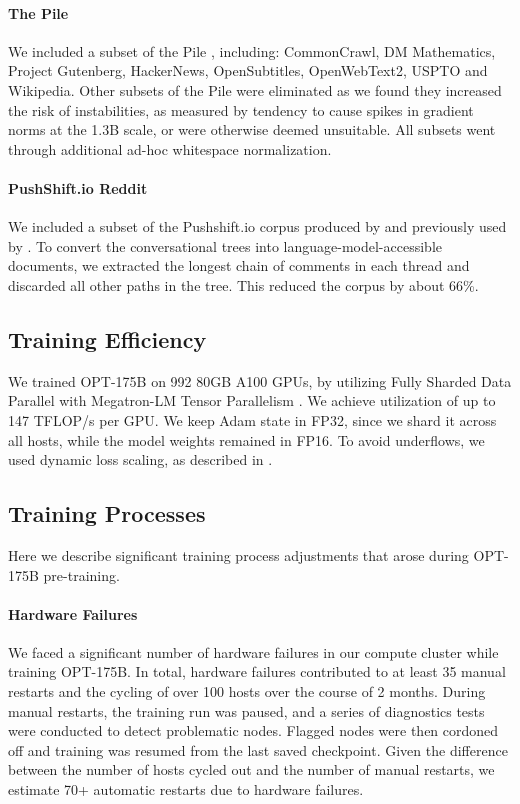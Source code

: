 \documentclass[11pt]{article}
\newcommand{\OPT}[0]{{OPT-175B}}
\begin{document}
\paragraph{The Pile} We included a subset of the Pile \cite{thepile}, including: CommonCrawl, DM Mathematics,  Project Gutenberg, HackerNews, OpenSubtitles, OpenWebText2, USPTO and Wikipedia. Other subsets of the Pile were eliminated as we found they increased the risk of instabilities, as measured by tendency to cause spikes in gradient norms at the 1.3B scale, or were otherwise deemed unsuitable.  All subsets went through additional ad-hoc whitespace normalization.

\paragraph{PushShift.io Reddit} We included a subset of the Pushshift.io corpus produced by \citet{reddit2020} and previously used by \citet{roller-etal-2021-recipes}. To convert the conversational trees into language-model-accessible documents, we extracted the longest chain of comments in each thread and discarded all other paths in the tree. This reduced the corpus by about 66\%.


\subsection{Training Efficiency}
\label{sec:training_efficiency}
We trained \OPT{} on 992 80GB A100 GPUs, by utilizing Fully Sharded Data Parallel \cite{1TMoE2021} with Megatron-LM Tensor Parallelism \cite{shoeybi2019megatron}. We achieve utilization of up to 147 TFLOP/s per GPU. We keep Adam state in FP32, since we shard it across all hosts, while the model weights remained in FP16. To avoid underflows, we used dynamic loss scaling, as described in \citet{micikevicius2017mixed}.


\subsection{Training Processes}
Here we describe significant training process adjustments that arose during \OPT{} pre-training.

\label{sec:training_process}
\paragraph{Hardware Failures} 
We faced a significant number of hardware failures in our compute cluster while training \OPT{}. In total, hardware failures contributed to at least 35 manual restarts and the cycling of over 100 hosts over the course of 2 months. During manual restarts, the training run was paused, and a series of diagnostics tests were conducted to detect problematic nodes. Flagged nodes were then cordoned off and training was resumed from the last saved checkpoint. Given the difference between the number of hosts cycled out and the number of manual restarts, we estimate 70+ automatic restarts due to hardware failures. 
\end{document}
